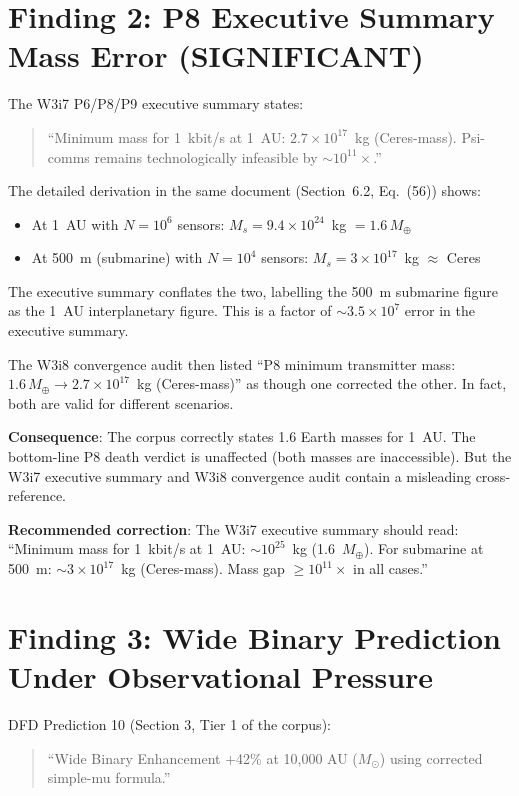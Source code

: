 \documentclass[11pt]{article}
\newcommand{\ee}[1]{\times 10^{#1}}
\begin{document}
\section{Finding 2: P8 Executive Summary Mass Error (SIGNIFICANT)}
\label{sec:P8-mass}

The W3i7 P6/P8/P9 executive summary states:

\begin{quote}
``Minimum mass for 1~kbit/s at 1~AU: $2.7\ee{17}$~kg (Ceres-mass).
Psi-comms remains technologically infeasible by $\sim 10^{11}\times$.''
\end{quote}

The detailed derivation in the same document (Section~6.2,
Eq.~(56)) shows:
\begin{itemize}[nosep]
\item At 1~AU with $N = 10^6$ sensors: $M_s = 9.4\ee{24}$~kg $= 1.6\,M_\oplus$
\item At 500~m (submarine) with $N = 10^4$ sensors: $M_s = 3\ee{17}$~kg $\approx$ Ceres
\end{itemize}

The executive summary conflates the two, labelling the 500~m submarine
figure as the 1~AU interplanetary figure. This is a factor of
$\sim 3.5\ee{7}$ error in the executive summary.

The W3i8 convergence audit then listed ``P8 minimum transmitter mass:
$1.6\,M_\oplus \to 2.7\ee{17}$~kg (Ceres-mass)'' as though one
corrected the other. In fact, both are valid for different scenarios.

\textbf{Consequence}: The corpus correctly states 1.6 Earth masses for
1~AU. The bottom-line P8 death verdict is unaffected (both masses are
inaccessible). But the W3i7 executive summary and W3i8 convergence
audit contain a misleading cross-reference.

\textbf{Recommended correction}: The W3i7 executive summary should read:
``Minimum mass for 1~kbit/s at 1~AU: $\sim 10^{25}$~kg
(1.6~$M_\oplus$). For submarine at 500~m: $\sim 3\ee{17}$~kg
(Ceres-mass). Mass gap $\geq 10^{11}\times$ in all cases.''


\section{Finding 3: Wide Binary Prediction Under Observational Pressure}
\label{sec:wide-binary}

DFD Prediction 10 (Section 3, Tier 1 of the corpus):
\begin{quote}
``Wide Binary Enhancement +42\% at 10,000 AU ($M_\odot$) using
corrected simple-mu formula.''
\end{quote}
\end{document}

